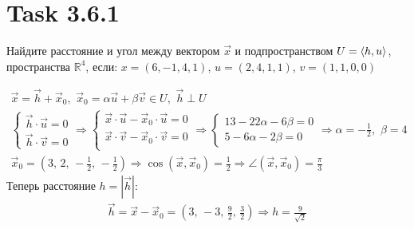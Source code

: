 \section{Task 3.6.1}
\begin{task}
    Найдите расстояние и угол между вектором $\vec{x}$ и подпространством $U = \braket{h,u}$, пространства $\mathbb{R}^4$, если: $x = (6, −1, 4, 1)$, $u = (2, 4, 1, 1)$, $v = (1, 1, 0, 0)$
\end{task}

\begin{solution}
    \begin{gather}
        \vec{x} = \vec{h} + \vec{x}_0,\,\,\vec{x}_0 = \alpha \vec{u} + \beta\vec{v} \in U,\,\,\vec{h}\perp U \\
        \begin{cases}
            \vec{h} \cdot \vec{u} = 0\\
            \vec{h} \cdot \vec{v} = 0
        \end{cases} \Longrightarrow
        \begin{cases}
            \vec{x}\cdot\vec{u} - \vec{x}_0 \cdot \vec{u} = 0\\
            \vec{x}\cdot\vec{v} - \vec{x}_0 \cdot \vec{v} = 0\\
        \end{cases}\Longrightarrow
        \begin{cases}
            13 - 22\alpha - 6\beta = 0 \\
            5 - 6 \alpha - 2\beta = 0
        \end{cases}\Longrightarrow\alpha=-\frac12,\,\,\beta=4 \\
        \vec{x}_0 = \left(3,\,2,\,-\frac12,\,-\frac12\right) \Longrightarrow \cos(\vec{x}, \vec{x}_0) = \frac12 \Longrightarrow \angle(\vec{x},\vec{x}_0) = \frac{\pi}{3}
    \end{gather}
    Теперь расстояние $h = |\vec{h}|$:
    \begin{gather}
        \vec{h} = \vec{x} - \vec{x}_0 = \left(3,\,-3,\,\frac92,\,\frac32\right) \Longrightarrow h = \frac{9}{\sqrt{2}}
    \end{gather}
\end{solution}